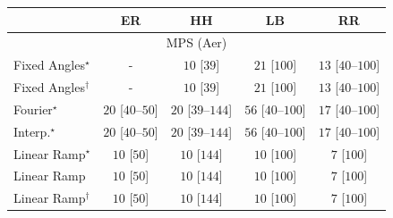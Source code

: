 \begin{tabular}{l|cccc|}
\toprule
            & ER & HH & LB & RR \\
\midrule
\multicolumn{5}{c}{\rule{0pt}{8pt}MPS (Aer)} \\
\midrule
Fixed Angles$^\star$ & {\cellcolor[HTML]{000000}} \color[HTML]{F1F1F1} {\cellcolor{white}} \color{black} - & {\cellcolor[HTML]{F7FCF5}} \color[HTML]{000000} $10$ [$39$] & {\cellcolor[HTML]{F5FBF2}} \color[HTML]{000000} $21$ [$100$] & {\cellcolor[HTML]{F6FCF4}} \color[HTML]{000000} $13$ [$40$--$100$] \\
Fixed Angles$^\dagger$ & {\cellcolor[HTML]{000000}} \color[HTML]{F1F1F1} {\cellcolor{white}} \color{black} - & {\cellcolor[HTML]{F7FCF5}} \color[HTML]{000000} $10$ [$39$] & {\cellcolor[HTML]{F5FBF2}} \color[HTML]{000000} $21$ [$100$] & {\cellcolor[HTML]{F6FCF4}} \color[HTML]{000000} $13$ [$40$--$100$] \\
Fourier$^\star$ & {\cellcolor[HTML]{F5FBF2}} \color[HTML]{000000} $20$ [$40$--$50$] & {\cellcolor[HTML]{F5FBF2}} \color[HTML]{000000} $20$ [$39$--$144$] & {\cellcolor[HTML]{EFF9EB}} \color[HTML]{000000} $56$ [$40$--$100$] & {\cellcolor[HTML]{F5FBF3}} \color[HTML]{000000} $17$ [$40$--$100$] \\
Interp.$^\star$ & {\cellcolor[HTML]{F5FBF2}} \color[HTML]{000000} $20$ [$40$--$50$] & {\cellcolor[HTML]{F5FBF2}} \color[HTML]{000000} $20$ [$39$--$144$] & {\cellcolor[HTML]{EFF9EB}} \color[HTML]{000000} $56$ [$40$--$100$] & {\cellcolor[HTML]{F5FBF3}} \color[HTML]{000000} $17$ [$40$--$100$] \\
Linear Ramp$^\star$ & {\cellcolor[HTML]{F7FCF5}} \color[HTML]{000000} $10$ [$50$] & {\cellcolor[HTML]{F7FCF5}} \color[HTML]{000000} $10$ [$144$] & {\cellcolor[HTML]{F7FCF5}} \color[HTML]{000000} $10$ [$100$] & {\cellcolor[HTML]{F7FCF5}} \color[HTML]{000000} $7$ [$100$] \\
Linear Ramp & {\cellcolor[HTML]{F7FCF5}} \color[HTML]{000000} $10$ [$50$] & {\cellcolor[HTML]{F7FCF5}} \color[HTML]{000000} $10$ [$144$] & {\cellcolor[HTML]{F7FCF5}} \color[HTML]{000000} $10$ [$100$] & {\cellcolor[HTML]{F7FCF5}} \color[HTML]{000000} $7$ [$100$] \\
Linear Ramp$^\dagger$ & {\cellcolor[HTML]{F7FCF5}} \color[HTML]{000000} $10$ [$50$] & {\cellcolor[HTML]{F7FCF5}} \color[HTML]{000000} $10$ [$144$] & {\cellcolor[HTML]{F7FCF5}} \color[HTML]{000000} $10$ [$100$] & {\cellcolor[HTML]{F7FCF5}} \color[HTML]{000000} $7$ [$100$] \\

\end{tabular}
